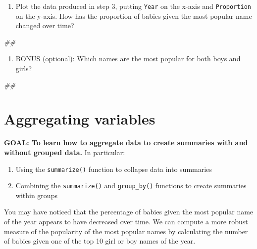 \documentclass[]{book}
\newenvironment{Shaded}{\begin{snugshade}}{\end{snugshade}}
\newcommand{\CommentTok}[1]{\textcolor[rgb]{0.56,0.35,0.01}{\textit{#1}}}
\providecommand{\tightlist}{%
  \setlength{\itemsep}{0pt}\setlength{\parskip}{0pt}}
\begin{document}
\begin{enumerate}
\def\labelenumi{\arabic{enumi}.}
\setcounter{enumi}{3}
\tightlist
\item
  Plot the data produced in step 3, putting \texttt{Year} on the x-axis
  and \texttt{Proportion} on the y-axis. How has the proportion of babies
  given the most popular name changed over time?
\end{enumerate}

\begin{Shaded}
\begin{Highlighting}[]
\CommentTok{##}
\end{Highlighting}
\end{Shaded}

\begin{enumerate}
\def\labelenumi{\arabic{enumi}.}
\setcounter{enumi}{4}
\tightlist
\item
  BONUS (optional): Which names are the most popular for both boys and girls?
\end{enumerate}

\begin{Shaded}
\begin{Highlighting}[]
\CommentTok{##}
\end{Highlighting}
\end{Shaded}

\hypertarget{aggregating-variables}{%
\section{Aggregating variables}\label{aggregating-variables}}

\textbf{GOAL: To learn how to aggregate data to create summaries with and without grouped data.} In particular:

\begin{enumerate}
\def\labelenumi{\arabic{enumi}.}
\tightlist
\item
  Using the \texttt{summarize()} function to collapse data into summaries
\item
  Combining the \texttt{summarize()} and \texttt{group\_by()} functions to create summaries within groups
\end{enumerate}

You may have noticed that the percentage of babies given the most
popular name of the year appears to have decreased over time. We can
compute a more robust measure of the popularity of the most popular
names by calculating the number of babies given one of the top 10 girl
or boy names of the year.
\end{document}
